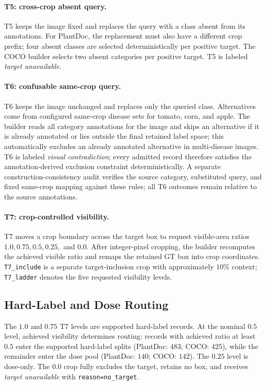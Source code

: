 \documentclass[letterpaper]{article}
\begin{document}
\paragraph{T5: cross-crop absent query.}
T5 keeps the image fixed and replaces the query with a class absent from its
annotations. For PlantDoc, the replacement must also have a different crop
prefix; four absent classes are selected deterministically per positive target.
The COCO builder selects two absent categories per positive target. T5 is
labeled \emph{target unavailable}.

\paragraph{T6: confusable same-crop query.}
T6 keeps the image unchanged and replaces only the queried class.
Alternatives come from configured same-crop disease sets for tomato, corn, and
apple. The builder reads all category annotations for the image and skips an
alternative if it is already annotated or lies outside the final retained label
space; this automatically excludes an already annotated alternative in
multi-disease images. T6 is labeled \emph{visual contradiction}; every admitted
record therefore satisfies the annotation-derived exclusion constraint
deterministically. A separate construction-consistency audit verifies the source
category, substituted query, and fixed same-crop mapping against these rules;
all T6 outcomes remain relative to the source annotations.

\paragraph{T7: crop-controlled visibility.}
T7 moves a crop boundary across the target box to request visible-area ratios
$1.0,0.75,0.5,0.25,$ and $0.0$. After integer-pixel cropping, the builder
recomputes the achieved visible ratio and remaps the retained GT box into crop
coordinates. \texttt{T7\_include} is a separate target-inclusion crop with
approximately $10\%$ context; \texttt{T7\_ladder} denotes the five requested
visibility levels.

\subsection{Hard-Label and Dose Routing}
\label{sec:visibility_routing}

The $1.0$ and $0.75$ T7 levels are supported hard-label records. At the nominal
$0.5$ level, achieved visibility determines routing: records with achieved
ratio at least $0.5$ enter the supported hard-label splits (PlantDoc: $483$;
COCO: $425$), while the remainder enter the dose pool (PlantDoc: $140$; COCO:
$142$). The $0.25$ level is dose-only. The $0.0$ crop fully excludes the target,
retains no box, and receives \emph{target unavailable} with
\texttt{reason=no\_target}.
\end{document}
